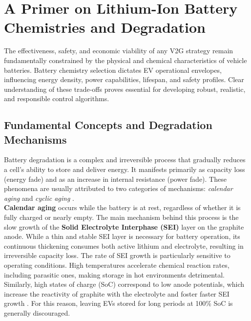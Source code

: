 
\section{A Primer on Lithium-Ion Battery Chemistries and Degradation}

The effectiveness, safety, and economic viability of any V2G strategy remain fundamentally constrained by the physical and chemical characteristics of vehicle batteries. Battery chemistry selection dictates EV operational envelopes, influencing energy density, power capabilities, lifespan, and safety profiles. Clear understanding of these trade-offs proves essential for developing robust, realistic, and responsible control algorithms.
\subsection{Fundamental Concepts and Degradation Mechanisms}
Battery degradation is a complex and irreversible process that gradually reduces a cell’s ability to store and deliver energy. It manifests primarily as capacity loss (energy fade) and as an increase in internal resistance (power fade). These phenomena are usually attributed to two categories of mechanisms: \textit{calendar aging} and \textit{cyclic aging} \cite{birkl2017degradation}.
\noindent   
\\
\textbf{Calendar aging} occurs while the battery is at rest, regardless of whether it is fully charged or nearly empty. The main mechanism behind this process is the slow growth of the \textbf{Solid Electrolyte Interphase (SEI)} layer on the graphite anode. While a thin and stable SEI layer is necessary for battery operation, its continuous thickening consumes both active lithium and electrolyte, resulting in irreversible capacity loss. The rate of SEI growth is particularly sensitive to operating conditions. High temperatures accelerate chemical reaction rates, including parasitic ones, making storage in hot environments detrimental. Similarly, high states of charge (SoC) correspond to low anode potentials, which increase the reactivity of graphite with the electrolyte and foster faster SEI growth \cite{vetter2005ageing}. For this reason, leaving EVs stored for long periods at 100\% SoC is generally discouraged.
\noindent   
\\
